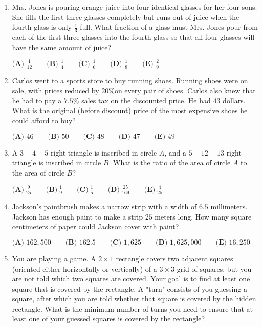 \documentclass{article}
\begin{document}
\begin{enumerate}[label=\arabic*., itemsep=0.5em]
\item Mrs. Jones is pouring orange juice into four identical glasses for her four sons. She fills the first three glasses completely but runs out of juice when the fourth glass is only \(\frac{1}{3}\) full. What fraction of a glass must Mrs. Jones pour from each of the first three glasses into the fourth glass so that all four glasses will have the same amount of juice?

\(\textbf{(A) }\frac{1}{12}\qquad\textbf{(B) }\frac{1}{4}\qquad\textbf{(C) }\frac{1}{6}\qquad\textbf{(D) }\frac{1}{8}\qquad\textbf{(E) }\frac{2}{9}\)\par \vspace{0.5em}\item Carlos went to a sports store to buy running shoes. Running shoes were on sale, with prices reduced by \(20\%\)on every pair of shoes. Carlos also knew that he had to pay a \(7.5\%\) sales tax on the discounted price. He had \(43\) dollars. What is the original (before discount) price of the most expensive shoes he could afford to buy?

\(\textbf{(A) }46\qquad\textbf{(B) }50\qquad\textbf{(C) }48\qquad\textbf{(D) }47\qquad\textbf{(E) }49\)\par \vspace{0.5em}\item A \(3-4-5\) right triangle is inscribed in circle \(A\), and a \(5-12-13\) right triangle is inscribed in circle \(B\). What is the ratio of the area of circle \(A\) to the area of circle \(B\)?

\(\textbf{(A)}~\frac{9}{25}\qquad\textbf{(B)}~\frac{1}{9}\qquad\textbf{(C)}~\frac{1}{5}\qquad\textbf{(D)}~\frac{25}{169}\qquad\textbf{(E)}~\frac{4}{25}\)\par \vspace{0.5em}\item Jackson's paintbrush makes a narrow strip with a width of \(6.5\) millimeters. Jackson has enough paint to make a strip \(25\) meters long. How many square centimeters of paper could Jackson cover with paint?

\(\textbf{(A) }162,500\qquad\textbf{(B) }162.5\qquad\textbf{(C) }1,625\qquad\textbf{(D) }1,625,000\qquad\textbf{(E) }16,250\)\par \vspace{0.5em}\item You are playing a game. A \(2 \times 1\) rectangle covers two adjacent squares (oriented either horizontally or vertically) of a \(3 \times 3\) grid of squares, but you are not told which two squares are covered. Your goal is to find at least one square that is covered by the rectangle. A "turn" consists of you guessing a square, after which you are told whether that square is covered by the hidden rectangle. What is the minimum number of turns you need to ensure that at least one of your guessed squares is covered by the rectangle?


\end{enumerate}
\end{document}
